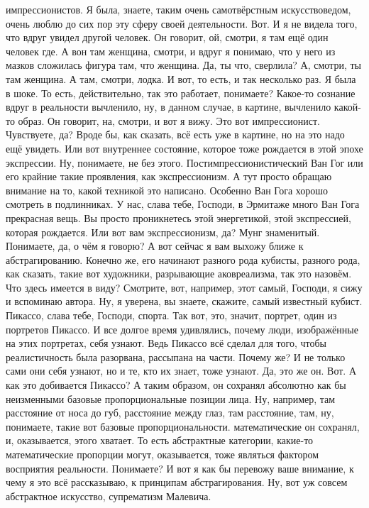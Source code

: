 импрессионистов. Я была, знаете, таким очень самотвёрстным искусствоведом, очень
люблю до сих пор эту сферу своей деятельности. Вот. И я не видела того, что
вдруг увидел другой человек. Он говорит, ой, смотри, я там ещё один человек где.
А вон там женщина, смотри, и вдруг я понимаю, что у него из мазков сложилась
фигура там, что женщина. Да, ты что, сверлила? А, смотри, ты там женщина. А там,
смотри, лодка. И вот, то есть, и так несколько раз. Я была в шоке. То есть,
действительно, так это работает, понимаете? Какое-то сознание вдруг в реальности
вычленило, ну, в данном случае, в картине, вычленило какой-то образ. Он говорит,
на, смотри, и вот я вижу. Это вот импрессионист. Чувствуете, да? Вроде бы, как
сказать, всё есть уже в картине, но на это надо ещё увидеть. Или вот внутреннее
состояние, которое тоже рождается в этой эпохе экспрессии. Ну, понимаете, не без
этого. Постимпрессионистический Ван Гог или его крайние такие проявления, как
экспрессионизм. А тут просто обращаю внимание на то, какой техникой это
написано. Особенно Ван Гога хорошо смотреть в подлинниках. У нас, слава тебе,
Господи, в Эрмитаже много Ван Гога прекрасная вещь. Вы просто проникнетесь этой
энергетикой, этой экспрессией, которая рождается. Или вот вам экспрессионизм,
да? Мунг знаменитый. Понимаете, да, о чём я говорю? А вот сейчас я вам выхожу
ближе к абстрагированию. Конечно же, его начинают разного рода кубисты, разного
рода, как сказать, такие вот художники, разрывающие аковреализма, так это
назовём. Что здесь имеется в виду? Смотрите, вот, например, этот самый, Господи,
я сижу и вспоминаю автора. Ну, я уверена, вы знаете, скажите, самый известный
кубист. Пикассо, слава тебе, Господи, спорта. Так вот, это, значит, портрет,
один из портретов Пикассо. И все долгое время удивлялись, почему люди,
изображённые на этих портретах, себя узнают. Ведь Пикассо всё сделал для того,
чтобы реалистичность была разорвана, рассыпана на части. Почему же? И не только
сами они себя узнают, но и те, кто их знает, тоже узнают. Да, это же он. Вот. А
как это добивается Пикассо? А таким образом, он сохранял абсолютно как бы
неизменными базовые пропорциональные позиции лица. Ну, например, там расстояние
от носа до губ, расстояние между глаз, там расстояние, там, ну, понимаете, такие
вот базовые пропорциональности. математические он сохранял, и, оказывается,
этого хватает. То есть абстрактные категории, какие-то математические пропорции
могут, оказывается, тоже являться фактором восприятия реальности. Понимаете? И
вот я как бы перевожу ваше внимание, к чему я это всё рассказываю, к принципам
абстрагирования. Ну, вот уж совсем абстрактное искусство, супрематизм Малевича.
